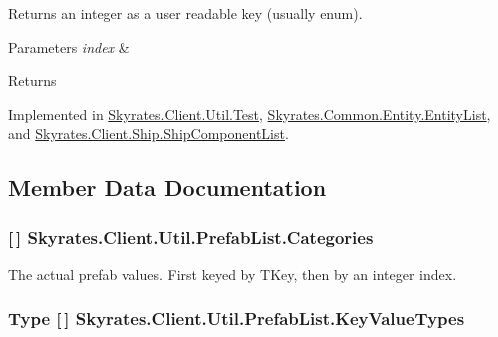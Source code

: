 Returns an integer as a user readable key (usually enum). 


\begin{DoxyParams}{Parameters}
{\em index} & \\
\hline
\end{DoxyParams}
\begin{DoxyReturn}{Returns}

\end{DoxyReturn}


Implemented in \hyperlink{class_skyrates_1_1_client_1_1_util_1_1_test_a6dfcf2dbe2aa97e9f193c09085a86d75}{Skyrates.\-Client.\-Util.\-Test}, \hyperlink{class_skyrates_1_1_common_1_1_entity_1_1_entity_list_a530e1a58f7f0eaddd8a5940b614b91b1}{Skyrates.\-Common.\-Entity.\-Entity\-List}, and \hyperlink{class_skyrates_1_1_client_1_1_ship_1_1_ship_component_list_a85071fae3afe111dc7e0c55d2adbb943}{Skyrates.\-Client.\-Ship.\-Ship\-Component\-List}.



\subsection{Member Data Documentation}
\hypertarget{class_skyrates_1_1_client_1_1_util_1_1_prefab_list_ac7e03e13d80aa784f26ca91dc37c59f0}{
\subsubsection[{Categories}]{ \mbox{[}$\,$\mbox{]} Skyrates.\-Client.\-Util.\-Prefab\-List.\-Categories}}\label{class_skyrates_1_1_client_1_1_util_1_1_prefab_list_ac7e03e13d80aa784f26ca91dc37c59f0}


The actual prefab values. First keyed by T\-Key, then by an integer index. 

\hypertarget{class_skyrates_1_1_client_1_1_util_1_1_prefab_list_a1f0c9a7b7682fcc2ec806eb6a61aeeaa}{
\subsubsection[{Key\-Value\-Types}]{\setlength{\rightskip}{0pt plus 5cm}Type \mbox{[}$\,$\mbox{]} Skyrates.\-Client.\-Util.\-Prefab\-List.\-Key\-Value\-Types}}\label{class_skyrates_1_1_client_1_1_util_1_1_prefab_list_a1f0c9a7b7682fcc2ec806eb6a61aeeaa}


